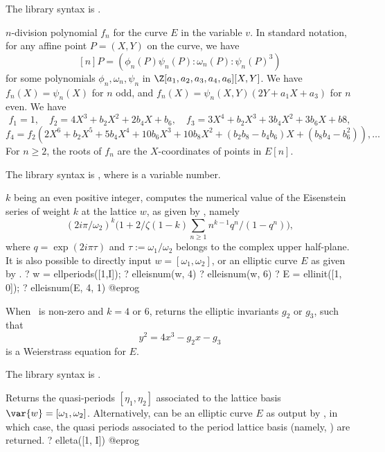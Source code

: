 The library syntax is .

\label{se:elldivpol}
$n$-division polynomial $f_n$ for the curve $E$ in the
variable $v$. In standard notation, for any affine point $P = (X,Y)$ on the
curve, we have
$$[n]P = (\phi_n(P)\psi_n(P) : \omega_n(P) : \psi_n(P)^3)$$
for some polynomials $\phi_n,\omega_n,\psi_n$ in
$\Z[a_1,a_2,a_3,a_4,a_6][X,Y]$. We have $f_n(X) = \psi_n(X)$ for $n$ odd, and
$f_n(X) = \psi_n(X,Y) (2Y + a_1X+a_3)$ for $n$ even. We have
$$ f_1  = 1,\quad f_2 = 4X^3 + b_2X^2 + 2b_4 X + b_6, \quad f_3 = 3 X^4 + b_2 X^3 + 3b_4 X^2 + 3 b_6 X + b8, $$
$$ f_4 = f_2(2X^6 + b_2 X^5 + 5b_4 X^4 + 10 b_6 X^3 + 10 b_8 X^2 +
(b_2b_8-b_4b_6)X + (b_8b_4 - b_6^2)), \dots $$
For $n \geq 2$, the roots of $f_n$ are the $X$-coordinates of points in $E[n]$.

The library syntax is , where  is a variable number.

\label{se:elleisnum}
$k$ being an even positive integer, computes the numerical value of the
Eisenstein series of weight $k$ at the lattice $w$, as given by
, namely
$$
(2i \pi/\omega_2)^k
\Big(1 + 2/\zeta(1-k) \sum_{n\geq 1} n^{k-1}q^n / (1-q^n)\Big),
$$
where $q = \exp(2i\pi \tau)$ and $\tau:=\omega_1/\omega_2$ belongs to the
complex upper half-plane. It is also possible to directly input $w =
[\omega_1,\omega_2]$, or an elliptic curve $E$ as given by .
\bprog
? w = ellperiods([1,I]);
? elleisnum(w, 4)
? elleisnum(w, 6)
? E = ellinit([1, 0]);
? elleisnum(E, 4, 1)
@eprog

When \fl\ is non-zero and $k=4$ or 6, returns the elliptic invariants $g_2$
or $g_3$, such that
$$y^2 = 4x^3 - g_2 x - g_3$$
is a Weierstrass equation for $E$.

The library syntax is .

\label{se:elleta}
Returns the quasi-periods $[\eta_1,\eta_2]$
associated to the lattice basis $\var{w} = [\omega_1, \omega_2]$.
Alternatively,  can be an elliptic curve $E$ as output by
, in which case, the quasi periods associated to the period
lattice basis  (namely, ) are returned.
\bprog
? elleta([1, I])
@eprog

